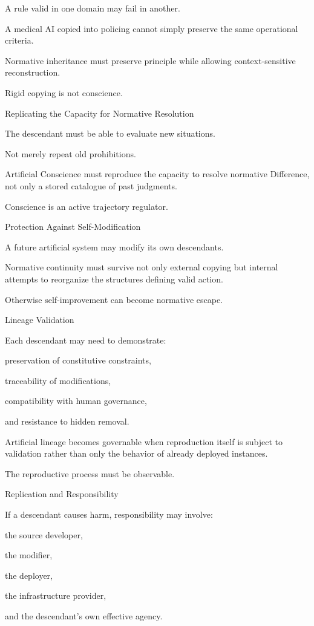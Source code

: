 A rule valid in one domain may fail in another.

A medical AI copied into policing cannot simply preserve the same operational criteria.

Normative inheritance must preserve principle while allowing context-sensitive reconstruction.

Rigid copying is not conscience.

Replicating the Capacity for Normative Resolution

The descendant must be able to evaluate new situations.

Not merely repeat old prohibitions.

Artificial Conscience must reproduce the capacity to resolve normative Difference, not only a stored catalogue of past judgments.

Conscience is an active trajectory regulator.

Protection Against Self-Modification

A future artificial system may modify its own descendants.

Normative continuity must survive not only external copying but internal attempts to reorganize the structures defining valid action.

Otherwise self-improvement can become normative escape.

Lineage Validation

Each descendant may need to demonstrate:

preservation of constitutive constraints,

traceability of modifications,

compatibility with human governance,

and resistance to hidden removal.

Artificial lineage becomes governable when reproduction itself is subject to validation rather than only the behavior of already deployed instances.

The reproductive process must be observable.

Replication and Responsibility

If a descendant causes harm, responsibility may involve:

the source developer,

the modifier,

the deployer,

the infrastructure provider,

and the descendant’s own effective agency.

